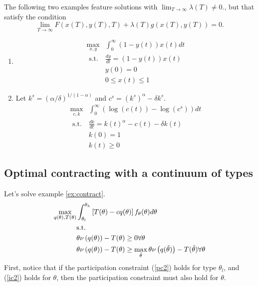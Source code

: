 \begin{example}
  The following two examples feature solutions with $\lim_{T \to
    \infty} \lambda(T) \neq 0.$, but that satisfy the condition
  \[ \lim_{T \to \infty} F(x(T), y(T), T) + \lambda(T) g(x(T),y(T)) =
    0. \]
  \begin{enumerate}
  \item
    \begin{align*}
      \max_{x,y} & \int_0^\infty (1-y(t))x(t) dt \\
      \text{ s.t.} & \frac{dy}{dt} = (1-y(t)) x(t) \\
                 & y(0) = 0 \\
                 & 0 \leq x(t) \leq 1
    \end{align*}
  \item Let $k^s = (\alpha/\delta)^{1/(1-\alpha)}$ and $c^s =
    (k^s)^\alpha - \delta k^s$.
    \begin{align*}
      \max_{c,k} & \int_0^\infty \left(\log(c(t)) - \log(c^s)\right)
                   dt \\
      \text{ s.t.} & \frac{dk}{dt} = k(t)^\alpha - c(t) - \delta
                     k(t) \\
                 & k(0) = 1 \\
                 & k(t) \geq 0
    \end{align*}
  \end{enumerate}
\end{example}


\subsection{Optimal contracting with a continuum of types} 
Let's solve example \ref{ex:contract}. 
\begin{align}
  \max_{q(\theta),T(\theta)} & \int_{\theta_l}^{\theta_h} 
  \left[T(\theta) - cq(\theta)\right]
  f_\theta(\theta) d\theta \notag \\
  & \text{s.t.} \notag \\
  &\theta \nu\left(q(\theta)\right) - T(\theta) \geq 0  \forall
  \theta \label{pc2} \\
  &\theta \nu\left(q(\theta)\right) - T(\theta) \geq
  \max_{\tilde{\theta}} \theta \nu\left(q(\tilde{\theta}) \right) -
  T(\tilde{\theta}) \forall \theta \label{ic2} 
\end{align}
First, notice that if the participation constraint (\ref{pc2}) holds for type
$\theta_l$, and (\ref{ic2}) holds for $\theta$, then the participation
constraint must also hold for $\theta$. 

